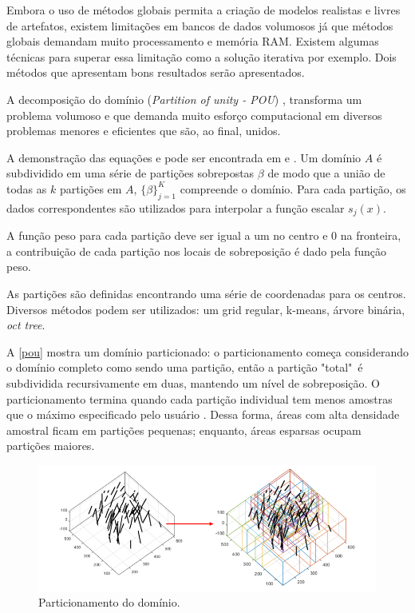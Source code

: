 Embora o uso de métodos globais permita a criação de modelos realistas e livres de artefatos, existem limitações em bancos de dados volumosos já que métodos globais demandam muito processamento e memória RAM. Existem algumas técnicas para superar essa limitação como a solução iterativa \cite{beatson1999fast} por exemplo. Dois métodos que apresentam bons resultados serão apresentados.

 \label{dom_decomp}

A decomposição do domínio (\textit{Partition of unity - POU}) \cite{wendland2004scattered}, transforma um problema volumoso e que demanda muito esforço computacional em diversos problemas menores e eficientes que são, ao final, unidos.

A demonstração das equações e pode ser encontrada em  e . Um domínio $A$ é subdividido em uma série de partições sobrepostas $\beta$ de modo que a união de todas as $k$ partições em $A$, $\{ \beta \}^K_{j=1}$ compreende o domínio. Para cada partição, os dados correspondentes são utilizados para interpolar a função escalar $s_j(x)$.

A função peso para cada partição deve ser igual a um no centro e 0 na fronteira, a contribuição de cada partição nos locais de sobreposição é dado pela função peso.

As partições são definidas encontrando uma série de coordenadas para os centros. Diversos métodos podem ser utilizados: um grid regular, k-means, árvore binária, \textit{oct tree}.

A \autoref{pou} mostra um domínio particionado: o particionamento começa considerando o domínio completo como sendo uma partição, então a partição "total"\ é subdividida recursivamente em duas, mantendo um nível de sobreposição. O particionamento termina quando cada partição individual tem menos amostras que o máximo especificado pelo usuário \cite{martin2017implicitmodeling, martin2017iterative}. Dessa forma, áreas com alta densidade amostral ficam em partições pequenas; enquanto, áreas esparsas ocupam partições maiores.

\begin{figure}[H]
	\caption{\label{pou}Particionamento do domínio.}
	\centering
		\includegraphics[width=\textwidth]{capitulo_2/imagens/pou.jpg}
\end{figure}

